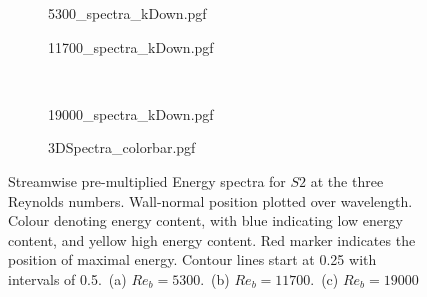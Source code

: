 \begin{figure}[h!]
    \centering
    \begin{subfigure}{0.495\textwidth}
        \subcaption{}
        {5300_spectra_kDown.pgf}
        \label{subfig: 5300 spectra kDown reyndolsComp}
    \end{subfigure}
    \hfill
        \begin{subfigure}{0.495\textwidth}
            \subcaption{}
            {11700_spectra_kDown.pgf}
            \label{subfig: 11700 spectra kDown reynoldsComp}
    \end{subfigure}
    \\[-20pt]
    \begin{subfigure}{0.495\textwidth}
        \subcaption{}
        {19000_spectra_kDown.pgf}
        \label{subfig: 19000 spectra kDwon reynoldsComp}
    \end{subfigure}
    \centering
    \begin{subfigure}{\textwidth}
        \centering
        \hspace{0.9cm}
        {3DSpectra_colorbar.pgf}
    \end{subfigure}
    \caption[Streamwise pre-multiplied energy spectra for $S2$]{Streamwise pre-multiplied Energy spectra for $S2$ at the three Reynolds numbers. Wall-normal position plotted over wavelength. Colour denoting energy content, with blue indicating low energy content, and yellow high energy content. Red marker indicates the position of maximal energy. Contour lines start at 0.25 with intervals of 0.5.~(a) $Re_b = 5300$.~(b) $Re_b = 11700$.~(c) $Re_b = 19000$}
    \label{fig: energy spectra S2}
\end{figure}
\newpage
